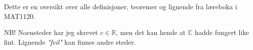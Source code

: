 Dette er en oversikt over alle definisjoner, teoremer og lignende
fra læreboka i MAT1120.

NB!
Noensteder har jeg skrevet $c\in\mathbb{R}$,
men det kan hende at $\mathbb{C}$ hadde fungert like fint.
Lignende \emph{"feil"} kan finnes andre steder.
